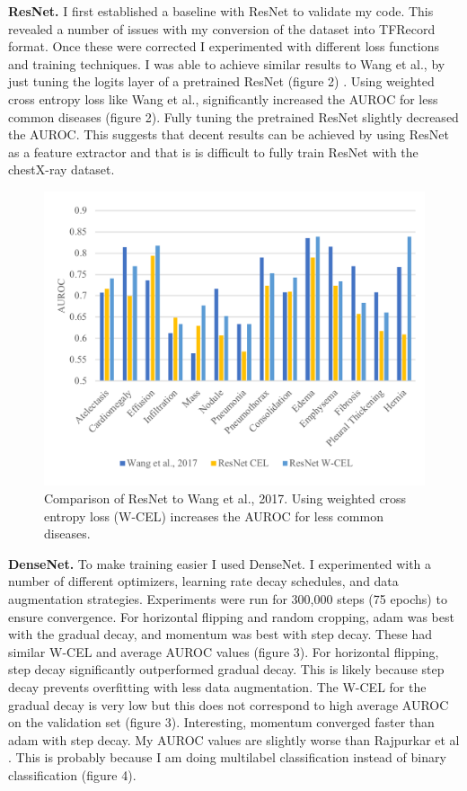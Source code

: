 \documentclass{article}
\begin{document}
{\bf ResNet.} I first established a baseline with ResNet to validate my code. This revealed a number of issues with my conversion of the dataset into TFRecord format. Once these were corrected I experimented with different loss functions and training techniques. I was able to achieve similar results to Wang et al., by just tuning the logits layer of a pretrained ResNet (figure 2) \cite{Wang}. Using weighted cross entropy loss like Wang et al., significantly increased the AUROC for less common diseases (figure 2). Fully tuning the pretrained ResNet slightly decreased the AUROC. This suggests that decent results can be achieved by using ResNet as a feature extractor and that is is difficult to fully train ResNet with the chestX-ray dataset.

\begin{figure}[p]
\vskip 0.2in
\begin{center}
\centerline{\includegraphics[width=\columnwidth]{figure_2}}
\caption{Comparison of ResNet to Wang et al., 2017. Using weighted cross entropy loss (W-CEL) increases the AUROC for less common diseases.}
\label{figure 2:}
\end{center}
\vskip -0.2in
\end{figure}

{\bf DenseNet.} To make training easier I used DenseNet. I experimented with a number of different optimizers, learning rate decay schedules, and data augmentation strategies. Experiments were run for 300,000 steps (75 epochs) to ensure convergence. For horizontal flipping and random cropping, adam was best with the gradual decay, and momentum was best with step decay. These had similar W-CEL and average AUROC values (figure 3). For horizontal flipping, step decay significantly outperformed gradual decay. This is likely because step decay prevents overfitting with less data augmentation. The W-CEL for the gradual decay is very low but this does not correspond to high average AUROC on the validation set (figure 3). Interesting, momentum converged faster than adam with step decay. My AUROC values are slightly worse than Rajpurkar et al \cite{Rajpurkar}. This is probably because I am doing multilabel classification instead of binary classification (figure 4).
\end{document}
